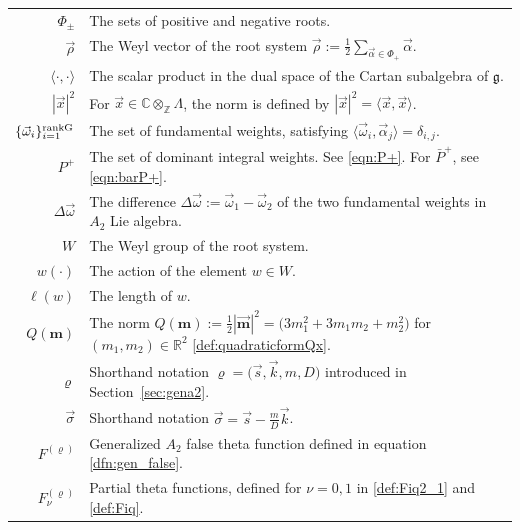 \documentclass[10pt,a4paper]{amsart}
\def\bos{\varrho}
\def\al{\alpha}
\theoremstyle{definition}
\numberwithin{equation}{section}
\begin{document}
\begin{table}[!ht]\renewcommand{\arraystretch}{1.3} \centering
	\begin{tabular}{r l}
		$\Phi_{\pm}$ & The sets of positive and negative roots.

\\		$\vec{\rho}$ & The Weyl vector of the root system $\vec{\rho}:=\frac{1}{2} \sum_{\vec{\al}\in\Phi_+} \vec{\al}$.
		\\
		$\langle \cdot,\cdot\rangle$ & The scalar product in the dual space of the Cartan subalgebra of $\mathfrak{g}$.
		\\
		$|\vec{x}|^2$ & For $\vec{x}\in\mathbb{C}\otimes_\mathbb{Z} \Lambda$, the norm is defined by $|\vec{x}|^2=\langle \vec{x},\vec{x}\rangle$.
		\\
		$\{\vec{\omega}_i\}_{i=1}^{\rm rankG}$ & The set of fundamental weights, satisfying $\langle \vec{\omega}_i,\vec{\alpha}_j \rangle = \delta_{i,j}$.
		\\
		$P^+$ & The set of dominant integral weights. See \eqref{eqn:P+}. For $\bar{P}^+$, see \eqref{eqn:barP+}.
		\\
		$\Delta \vec\omega$ &The difference $\Delta \vec\omega:= \vec\omega_1-\vec\omega_2$
		of the two fundamental weights in $A_2$ Lie algebra.
 		\\
		$W$ & The Weyl group of the root system.
		\\
		$w(\cdot )$ & The action of the element $w\in W$. \\ $\ell(w)$&
 The length of $w$.
		\\
		$Q(\mathbf{m})$ & The norm $ Q(\mathbf{m}):= \frac{1}{2}|\vec {\mathbf m}|^2= \bigl(3m_{1}^2+3m_1m_2+m_2^2\bigr)$ for $(m_1,m_2)\in {\mathbb R}^2$ \eqref{def:quadraticformQx}.\\
 $\bos$ & Shorthand notation $\bos = \bigl( \vec{s},\vec{k},m,D\bigr)$ introduced in Section~\ref{sec:gena2}.
		\\
		$\vec{\sigma}$ & Shorthand notation $\vec{\sigma}=\vec{s}-\tfrac{m}{D
 }\vec{k}$.
		\\
		$F^{(\bos)}$ & Generalized $A_2$ false theta function defined in equation \eqref{dfn:gen_false}.
		\\
		$F_\nu^{(\bos)}$ & Partial theta functions, defined for $\nu=0,1$ in \eqref{def:Fiq2_1} and \eqref{def:Fiq}. %
 \\

\end{tabular}
\end{table}
\end{document}
